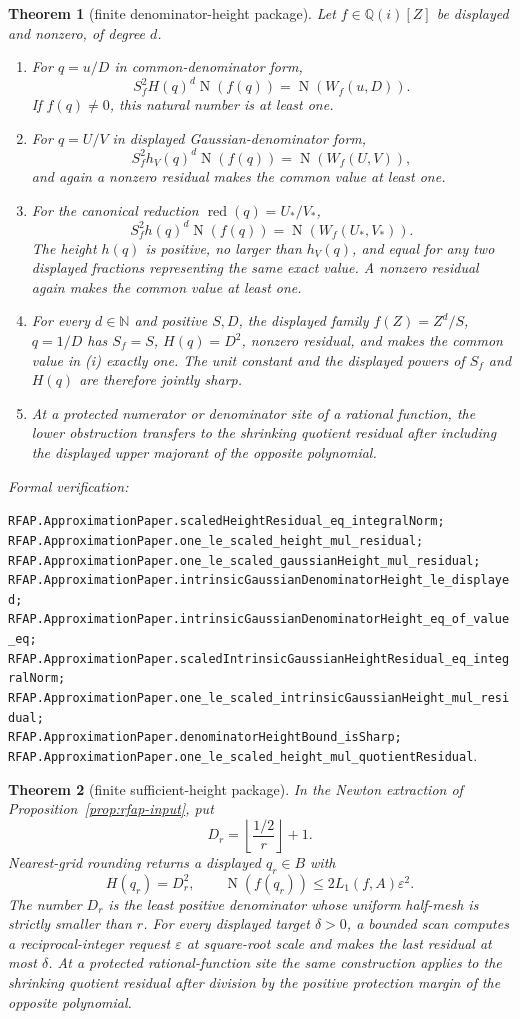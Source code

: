 \documentclass[11pt]{article}
\newtheorem{theorem}{Theorem}[section]
\newcommand{\Qi}{\mathbb{Q}(i)}
\newcommand{\N}{\mathbb{N}}
\newcommand{\Norm}[1]{\operatorname{N}\!\left(#1\right)}
\newcommand{\eps}{\varepsilon}
\newcommand{\leanref}[1]{\par\smallskip\noindent
  \emph{Formal verification:}\par\nobreak
  {\raggedright\nolinkurl{#1}.\par}}
\begin{document}
\begin{theorem}[finite denominator-height package]
\label{thm:height-package}
Let $f\in\Qi[Z]$ be displayed and nonzero, of degree $d$.
\begin{enumerate}[label=(\roman*)]
\item For $q=u/D$ in common-denominator form,
\[
 S_f^2H(q)^d\Norm{f(q)}=\Norm{W_f(u,D)}.
\]
If $f(q)\ne0$, this natural number is at least one.
\item For $q=U/V$ in displayed Gaussian-denominator form,
\[
 S_f^2h_V(q)^d\Norm{f(q)}=\Norm{W_f(U,V)},
\]
and again a nonzero residual makes the common value at least one.
\item For the canonical reduction
$\operatorname{red}(q)=U_*/V_*$,
\[
 S_f^2h(q)^d\Norm{f(q)}=\Norm{W_f(U_*,V_*)}.
\]
The height $h(q)$ is positive, no larger than $h_V(q)$, and equal for any
two displayed fractions representing the same exact value.  A nonzero
residual again makes the common value at least one.
\item For every $d\in\N$ and positive $S,D$, the displayed family
$f(Z)=Z^d/S$, $q=1/D$ has $S_f=S$, $H(q)=D^2$, nonzero residual, and makes
the common value in (i) exactly one.  The unit constant and the displayed
powers of $S_f$ and $H(q)$ are therefore jointly sharp.
\item At a protected numerator or denominator site of a rational function,
the lower obstruction transfers to the shrinking quotient residual after
including the displayed upper majorant of the opposite polynomial.
\end{enumerate}
\end{theorem}

\leanref{RFAP.ApproximationPaper.scaledHeightResidual_eq_integralNorm;
RFAP.ApproximationPaper.one_le_scaled_height_mul_residual;
RFAP.ApproximationPaper.one_le_scaled_gaussianHeight_mul_residual;
RFAP.ApproximationPaper.intrinsicGaussianDenominatorHeight_le_displayed;
RFAP.ApproximationPaper.intrinsicGaussianDenominatorHeight_eq_of_value_eq;
RFAP.ApproximationPaper.scaledIntrinsicGaussianHeightResidual_eq_integralNorm;
RFAP.ApproximationPaper.one_le_scaled_intrinsicGaussianHeight_mul_residual;
RFAP.ApproximationPaper.denominatorHeightBound_isSharp;
RFAP.ApproximationPaper.one_le_scaled_height_mul_quotientResidual}

\begin{theorem}[finite sufficient-height package]
\label{thm:sufficient-height-package}
In the Newton extraction of Proposition~\ref{prop:rfap-input}, put
\[
 D_r=\left\lfloor\frac{1/2}{r}\right\rfloor+1.
\]
Nearest-grid rounding returns a displayed $q_r\in B$ with
\[
 H(q_r)=D_r^2,
 \qquad \Norm{f(q_r)}\le2L_1(f,A)\eps^2.
\]
The number $D_r$ is the least positive denominator whose uniform half-mesh
is strictly smaller than $r$.  For every displayed target $\delta>0$, a
bounded scan computes a reciprocal-integer request $\eps$ at square-root
scale and makes the last residual at most $\delta$.  At a protected
rational-function site the same construction applies to the shrinking
quotient residual after division by the positive protection margin of the
opposite polynomial.
\end{theorem}
\end{document}
